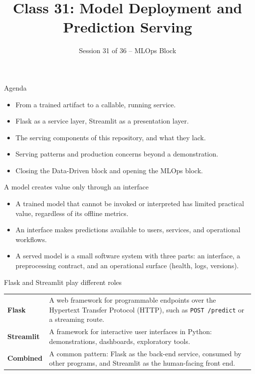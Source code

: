 
\usepackage{amssymb}

\title{Class 31: Model Deployment and Prediction Serving}
\subtitle{Session 31 of 36 -- MLOps Block}
\author{\coursename}
\date{}



\frame{\titlepage \coursefooter}

\begin{frame}{Agenda}
\begin{itemize}
\item From a trained artifact to a callable, running service.
\item Flask as a service layer, Streamlit as a presentation layer.
\item The serving components of this repository, and what they lack.
\item Serving patterns and production concerns beyond a demonstration.
\item Closing the Data-Driven block and opening the MLOps block.
\end{itemize}
\coursefooter
\end{frame}

\begin{frame}{A model creates value only through an interface}
\begin{itemize}
\item A trained model that cannot be invoked or interpreted has limited practical value, regardless of its offline metrics.
\item An interface makes predictions available to users, services, and operational workflows.
\item A served model is a small software system with three parts: an interface, a preprocessing contract, and an operational surface (health, logs, versions).
\end{itemize}
\coursefooter
\end{frame}

\begin{frame}{Flask and Streamlit play different roles}
\begin{tabularx}{\textwidth}{>{\bfseries}l X}
Flask & A web framework for programmable endpoints over the Hypertext Transfer Protocol (HTTP), such as \texttt{POST /predict} or a streaming route. \\
\addlinespace[0.3em]
Streamlit & A framework for interactive user interfaces in Python: demonstrations, dashboards, exploratory tools. \\
\addlinespace[0.3em]
Combined & A common pattern: Flask as the back-end service, consumed by other programs, and Streamlit as the human-facing front end. \\
\bottomrule
\end{tabularx}
\coursefooter
\end{frame}


